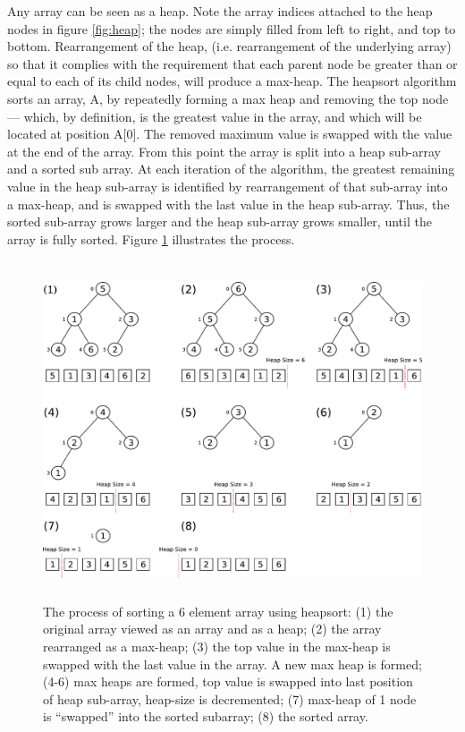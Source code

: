 \documentclass[12pt, a4paper]{article}
\begin{document}
Any array can be seen as a heap. Note the array indices attached to the heap nodes in figure \ref{fig:heap}; the nodes are simply filled from left to right, and top to bottom. Rearrangement of the heap, (i.e. rearrangement of the underlying array) so that it complies with the requirement that each parent node be greater than or equal to each of its child nodes, will produce a max-heap. The heapsort algorithm sorts an array, A, by repeatedly forming a max heap and removing the top node — which, by definition, is the greatest value in the array, and which will be located at position A[0]. The removed maximum value is swapped with the value at the end of the array. From this point the array is split into a heap sub-array and a sorted sub array. At each iteration of the algorithm, the greatest remaining value in the heap sub-array is identified by rearrangement of that sub-array into a max-heap, and is swapped with the last value in the heap sub-array. Thus, the sorted sub-array grows larger and the heap sub-array grows smaller, until the array is fully sorted. Figure \ref{fig:heapsort} illustrates the process.

\begin{figure}[H]
    \centering
    \includegraphics[height=10cm]{figures/heap_sort2.pdf}
    \caption{\label{fig:heapsort}The process of sorting a 6 element array using heapsort: (1) the original array viewed as an array and as a heap; (2) the array rearranged as a max-heap; (3) the top value in the max-heap is swapped with the last value in the array. A new max heap is formed; (4-6) max heaps are formed, top value is swapped into last position of heap sub-array, heap-size is decremented; (7) max-heap of 1 node is   ``swapped'' into the sorted subarray; (8) the sorted array.}
\end{figure}
\end{document}
